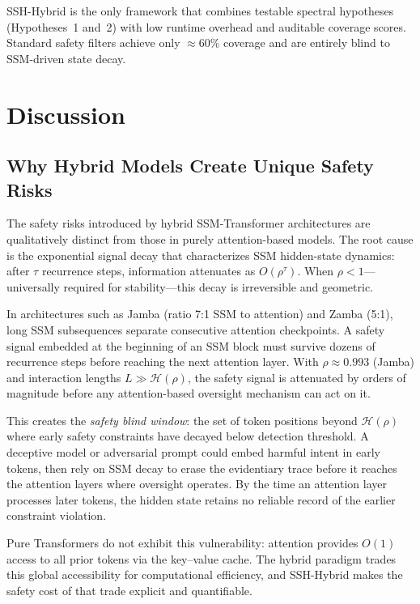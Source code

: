 \documentclass{article}
\newcommand{\Horizon}{\mathcal{H}(\rho)}
\begin{document}
\noindent SSH-Hybrid is the only framework that combines testable spectral hypotheses
(Hypotheses~1 and~2) with low runtime overhead and auditable coverage scores.
Standard safety filters achieve only $\approx$60\% coverage and are entirely blind to
SSM-driven state decay.



\section{Discussion}
\label{sec:discussion}

\subsection{Why Hybrid Models Create Unique Safety Risks}

The safety risks introduced by hybrid SSM-Transformer architectures are qualitatively distinct from those in purely attention-based models. The root cause is the exponential signal decay that characterizes SSM hidden-state dynamics: after $\tau$ recurrence steps, information attenuates as $O(\rho^\tau)$. When $\rho < 1$---universally required for stability---this decay is irreversible and geometric.

In architectures such as Jamba (ratio 7:1 SSM to attention) and Zamba (5:1), long SSM subsequences separate consecutive attention checkpoints. A safety signal embedded at the beginning of an SSM block must survive dozens of recurrence steps before reaching the next attention layer. With $\rho \approx 0.993$ (Jamba) and interaction lengths $L \gg \Horizon$, the safety signal is attenuated by orders of magnitude before any attention-based oversight mechanism can act on it.

This creates the \emph{safety blind window}: the set of token positions beyond $\Horizon$ where early safety constraints have decayed below detection threshold. A deceptive model or adversarial prompt could embed harmful intent in early tokens, then rely on SSM decay to erase the evidentiary trace before it reaches the attention layers where oversight operates. By the time an attention layer processes later tokens, the hidden state retains no reliable record of the earlier constraint violation.

Pure Transformers do not exhibit this vulnerability: attention provides $O(1)$ access to all prior tokens via the key--value cache. The hybrid paradigm trades this global accessibility for computational efficiency, and SSH-Hybrid makes the safety cost of that trade explicit and quantifiable.
\end{document}
